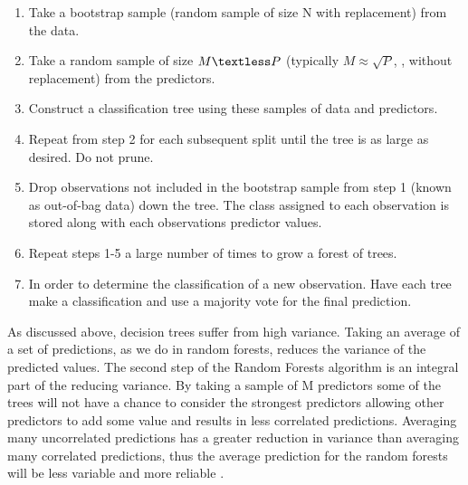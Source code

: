 \documentclass{article}
\begin{document}
\begin{enumerate}
	\item Take a bootstrap sample (random sample of size N with replacement) from the data. 
	\item Take a random sample of size $M \textless P$ (typically $M \approx \sqrt{P}$, \cite{james13}, without replacement) from the predictors. 
	\item Construct a classification tree using these samples of data and predictors.
	\item Repeat from step 2 for each subsequent split until the tree is as large as desired. Do not prune. 
	\item Drop observations not included in the bootstrap sample from step 1 (known as out-of-bag data) down the tree. The class assigned to each observation is stored along with each observations predictor values.
	\item Repeat steps 1-5 a large number of times to grow a forest of trees. 
	\item In order to determine the classification of a new observation. Have each tree make a classification and use a majority vote for the final prediction.
\end{enumerate}

As discussed above, decision trees suffer from high variance. Taking an average of a set of predictions, as we do in random forests, reduces the variance of the predicted values. The second step of the Random Forests algorithm is an integral part of the reducing variance. By taking a sample of M predictors some of the trees will not have a chance to consider the strongest predictors allowing other predictors to add some value and results in less correlated predictions. Averaging many uncorrelated predictions has a greater reduction in variance than averaging many correlated predictions, thus the average prediction for the random forests will be less variable and more reliable \citep{james13}.
\end{document}
